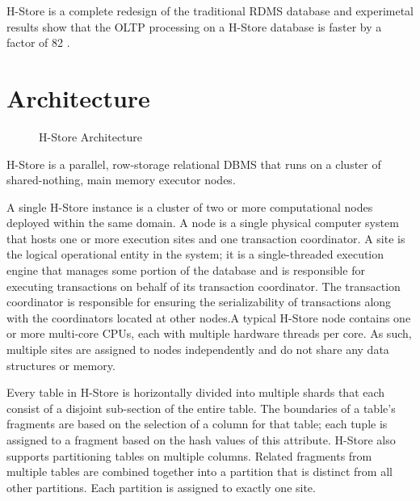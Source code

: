 \documentclass[9pt,twocolumn,twoside]{styles/osajnl}
\begin{document}
H-Store is a complete redesign of the traditional RDMS database and 
experimetal results show that the OLTP processing on a H-Store database is faster 
by a factor of 82 \cite{stonebraker2007}.

\section{Architecture}

\begin{figure}[http]
\centering
{}
\caption{H-Store Architecture} \cite{www-H-StoreArch}
\label{fig:false-color}
\end{figure}

H-Store is a parallel, row-storage relational DBMS that runs on a cluster of shared-nothing, main memory executor nodes.

A single H-Store instance is a cluster of two or more computational nodes deployed within the same domain. A node is a single physical computer system that hosts one or more execution sites and one transaction coordinator. A site is the logical operational entity in the system; it is a single-threaded execution engine that manages some portion of the database and is responsible for executing transactions on behalf of its transaction coordinator. The transaction coordinator is responsible for ensuring the serializability of transactions along with the coordinators located at other nodes.A typical H-Store node contains one or more multi-core CPUs, each with multiple hardware threads per core. As such, multiple sites are assigned to nodes independently and do not share any data structures or memory.

Every table in H-Store is horizontally divided into multiple shards that each consist of a disjoint sub-section of the entire table. The boundaries of a table’s fragments are based on the selection of a  column for that table; each tuple is assigned to a fragment based on the hash values of this attribute. H-Store also supports partitioning tables on multiple columns. Related fragments from multiple tables are combined together into a partition that is distinct from all other partitions. Each partition is assigned to exactly one site.
\end{document}
